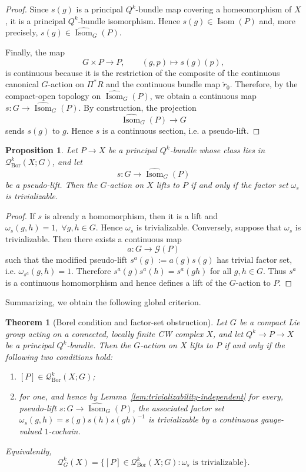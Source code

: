 \documentclass[11pt,a4paper]{article}
\numberwithin{equation}{section}
\newtheorem{prop}[definition]{Proposition}
\newtheorem{thm}[definition]{Theorem}
\theoremstyle{named}
\begin{document}
\begin{proof}
Since \(s(g)\) is a principal \(Q^k\)-bundle map covering a homeomorphism of \(X\), it is a principal \(Q^k\)-bundle isomorphism. Hence \(s(g)\in \operatorname{Isom}(P)\) and, more precisely, \(s(g)\in\widehat{\operatorname{Isom}}_G(P).\)

Finally, the map
\[
G\times P\longrightarrow P, \qquad (g,p)\longmapsto s(g)(p),
\]
is continuous because it is the restriction of the composite of the continuous canonical \(G\)-action on \(\Pi^*R\) and the continuous bundle map \(\widetilde r_0\). Therefore, by the compact-open topology on \(\widehat{\operatorname{Isom}}_G(P)\), we obtain a continuous map \(s:G\longrightarrow \widehat{\operatorname{Isom}}_G(P).\) By construction, the projection
\[
\widehat{\operatorname{Isom}}_G(P)\longrightarrow G
\]
sends \(s(g)\) to \(g\). Hence \(s\) is a continuous section, i.e. a pseudo-lift.
\end{proof}

\begin{prop}
\label{prop:global-obstruction}
Let \(P\to X\) be a principal \(Q^k\)-bundle whose class lies in \(\mathcal Q^k_{\mathrm{Bor}}(X;G)\), and let
\[
s:G\to \widehat{\operatorname{Isom}}_G(P)
\]
be a pseudo-lift. Then the \(G\)-action on \(X\) lifts to \(P\) if and only if the factor set \(\omega_s\) is trivializable.
\end{prop}

\begin{proof}
If \(s\) is already a homomorphism, then it is a lift and $
\omega_s(g,h)=1,\;\forall g,h\in G$. Hence \(\omega_s\) is trivializable. Conversely, suppose that \(\omega_s\) is trivializable. Then there exists a continuous map
\[
a:G\to \mathcal G(P)
\]
such that the modified pseudo-lift $s^a(g):=a(g)s(g)$ has trivial factor set, i.e. $\omega_{s^a}(g,h)=1$. Therefore $s^a(g)s^a(h)=s^a(gh)$ for all \(g,h\in G\). Thus \(s^a\) is a continuous homomorphism and hence defines a lift of the \(G\)-action to \(P\).
\end{proof}

Summarizing, we obtain the following global criterion.

\begin{thm}[Borel condition and factor-set obstruction]
\label{thm:global-q-HY}
Let \(G\) be a compact Lie group acting on a connected, locally finite CW complex \(X\), and let $
Q^k\longrightarrow P\longrightarrow X$
be a principal \(Q^k\)-bundle. Then the \(G\)-action on \(X\) lifts to \(P\) if and only if the following two conditions hold:
\begin{enumerate}
\item[(1)] \([P]\in \mathcal Q^k_{\mathrm{Bor}}(X;G)\);
\item[(2)] for one, and hence by Lemma~\ref{lem:trivializability-independent} for every, pseudo-lift $s:G\to \widehat{\operatorname{Isom}}_G(P)$,
the associated factor set $\omega_s(g,h)=s(g)s(h)s(gh)^{-1}$
is trivializable by a continuous gauge-valued \(1\)-cochain.
\end{enumerate}
Equivalently,
\[
\mathcal Q^k_G(X)
=
\{[P]\in \mathcal Q^k_{\mathrm{Bor}}(X;G):\omega_s \text{ is trivializable}\}.
\]
\end{thm}
\end{document}
